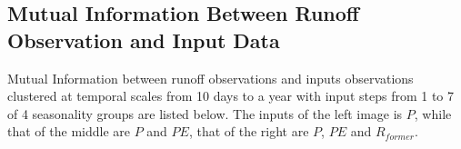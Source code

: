 \documentclass[11pt]{article}
\begin{document}


\fi











\iffalse
\subsection{Mutual Information Between Runoff Observation and Input Data}

Mutual Information between runoff observations and inputs observations clustered at temporal scales from 10 days to a year with input steps from 1 to 7 of 4 seasonality groups are listed below. The inputs of the left image is $P$, while that of the middle are $P$ and $PE$, that of the right are $P$, $PE$ and $R_{former}$.  
\end{document}
